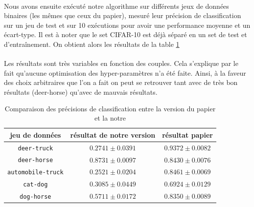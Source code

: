 \documentclass[11 pt]{article}
\begin{document}
\paragraph{}Nous avons ensuite exécuté notre algorithme sur différents jeux de données binaires (les mêmes que ceux du papier), mesur\'e leur précision de classification sur un jeu de test et sur 10 exécutions pour avoir une performance moyenne et un écart-type. Il est à noter que le set CIFAR-10 est déjà séparé en un set de test et d'entraînement. On obtient alors les résultats de la table \ref{table:res}
\paragraph{} Les résultats sont très variables en fonction des couples. Cela s'explique par le fait qu'aucune optimisation des hyper-paramètres n'a été faite. Ainsi, à la faveur des choix arbitraires que l'on a fait on peut se retrouver tant avec de très bon résultats (deer-horse) qu'avec de mauvais résultats.
\begin{table}[t]
  \centering
    \begin{tabular}{c c c}
      	\toprule
       	 jeu de données &résultat de notre version &résultat papier \\
        \midrule
      	\texttt{deer-truck} & $\mathbf{0.2741\pm0.0391}$ & $0.9372 \pm 0.0082$ \\
      	\texttt{deer-horse} & $\mathbf{0.8731 \pm0.0097}$ & $0.8430 \pm 0.0076$ \\
      	\texttt{automobile-truck} & $\mathbf{0.2521 \pm0.0204}$ & $0.8461 \pm 0.0069$\\
        \texttt{cat-dog} & $\mathbf{ 0.3085\pm0.0449}$ & $0.6924 \pm 0.0129$\\
        \texttt{dog-horse} & $\mathbf{0.5711 \pm0.0172}$ & $0.8350 \pm 0.0089$\\
      	\bottomrule
    \end{tabular}
    \caption{Comparaison des précisions de classification entre la version du papier et la notre}
    \label{table:res}
\end{table}
\end{document}
